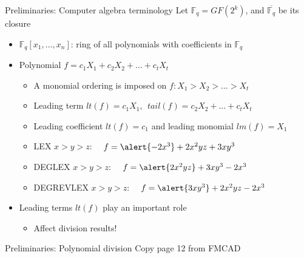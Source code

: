 \documentclass[xcolor=dvipsnames]{beamer}
\newcommand{\Fq}{{\mathbb{F}}_{q}}
\newcommand{\bi}{\begin{itemize}}
\newcommand{\ei}{\end{itemize}}
\begin{document}
\begin{frame}{\large{Preliminaries: Computer algebra terminology}}
\vspace{-0.2in}
Let $\mathbb{F}_q = GF(2^k)$, and $\overline{\Fq}$ be its closure
\begin{itemize}
\item $\mathbb{F}_q[x_1, \ldots, x_n]$: ring of all polynomials with
  coefficients in $\mathbb{F}_q$ 

\item Polynomial $f = c_1X_1 + c_2 X_2 + \dots + c_t X_t$
\bi
\item A monomial ordering is imposed on $f: X_1 > X_2 > \dots > X_t$
\item \alert{Leading term} $lt(f) = c_1 X_1, ~~tail(f) = c_2 X_2 + \dots + c_t X_t$
\item Leading coefficient $lt(f) = c_1$ and leading monomial $lm(f) = X_1$
\ei
\begin{itemize}
\item LEX $x> y> z$: ~~$f = \alert{ -2x^3} + 2x^2yz + 3xy^3$
\item  DEGLEX $x>y>z$:  ~~$f = \alert{ 2x^2yz} + 3xy^3 -2x^3$
\item DEGREVLEX $x>y>z$: ~~$f = \alert{3xy^3} + 2x^2yz - 2x^3$
\end{itemize}
\end{itemize}
\bi
\item Leading terms $lt(f)$ play an important role
\bi
\item Affect division results!
\ei
\ei

\end{frame}
\begin{frame}{\large{Preliminaries: Polynomial division}}
Copy page 12 from FMCAD
\end{frame}
\end{document}
